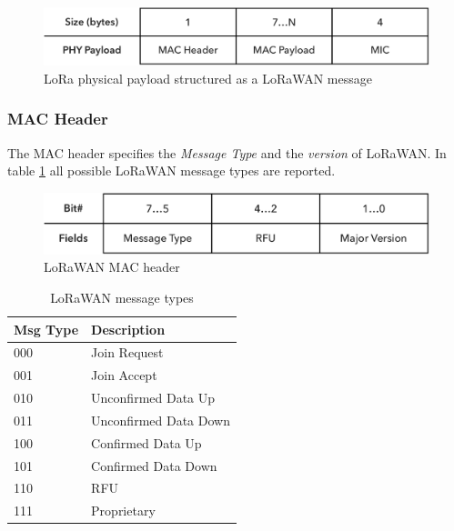\begin{figure}[h!]
\centering
\includegraphics[width=\textwidth]{img/msgformat/phy_payload}
\caption{LoRa physical payload structured as a LoRaWAN message}
\end{figure}


\subsubsection{MAC Header}
The MAC header specifies the \emph{Message Type} and the \emph{version} of LoRaWAN. In table \ref{tab:msgtypes} all possible LoRaWAN message types are reported.


\begin{figure}[h!]
\centering
\includegraphics[width=\textwidth]{img/msgformat/mac_header}
\caption{LoRaWAN MAC header}
\end{figure}




\begin{table}[h!]
\centering
\caption{LoRaWAN message types}
\label{tab:msgtypes}
\begin{tabular}{@{}ll@{}}
\toprule
Msg Type & Description          \\ \midrule
000          & Join Request          \\
001          & Join Accept           \\
010          & Unconfirmed Data Up   \\
011          & Unconfirmed Data Down \\
100          & Confirmed Data Up     \\
101          & Confirmed Data Down   \\
110          & RFU                   \\
111          & Proprietary           \\ \bottomrule
\end{tabular}
\end{table}


